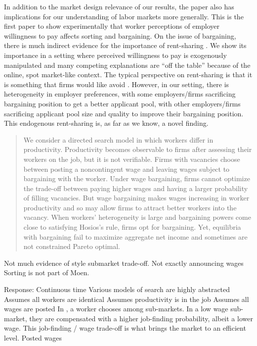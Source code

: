 In addition to the market design relevance of our results, the paper also has implications for our understanding of labor markets more generally.
This is the first paper to show experimentally that worker perceptions of employer willingness to pay affects sorting and bargaining.
On the issue of bargaining, there is much indirect evidence for the importance of rent-sharing \citep{blanchflower1996wages, card2015bargaining}.
We show its importance in a setting where perceived willingness to pay is exogenously manipulated and many competing explanations are ``off the table'' because of the online, spot market-like context.  
The typical perspective on rent-sharing is that it is something that firms would like avoid \citep{goldschmidt2017rise, weil2014fissured}.
However, in our setting, there is heterogeneity in employer preferences, with some employers/firms sacrificing bargaining position to get a better applicant pool, with other employers/firms sacrificing applicant pool size and quality to improve their bargaining position.
This endogenous rent-sharing is, as far as we know, a novel finding. 


\begin{quote}
\cite{michelacci2006incomplete}
We consider a directed search model in which workers differ in productivity. Productivity
becomes observable to firms after assessing their workers on the job, but it is not verifiable.
Firms with vacancies choose between posting a noncontingent wage and leaving wages
subject to bargaining with the worker. Under wage bargaining, firms cannot optimize the
trade-off between paying higher wages and having a larger probability of filling vacancies.
But wage bargaining makes wages increasing in worker productivity and so may allow firms to attract better workers into the vacancy. When workers’ heterogeneity is large and bargaining powers come close to satisfying Hosios’s rule, firms opt for bargaining. Yet, equilibria with bargaining fail to maximize aggregate net income and sometimes are not constrained Pareto optimal.

\end{quote}

Not much evidence of \cite{moen1997competitive} style submarket trade-off.
Not exactly announcing wages
Sorting is not part of Moen. 

Response:
\cite{moen1997competitive}
Continuous time 
Various models of search are highly abstracted 
Assumes all workers are identical
Assumes productivity is in the job
Assumes all wages are posted
In \cite{moen1997competitive}, a worker chooses among sub-markets.
In a low wage sub-market, they are compensated with a higher job-finding probability, albeit a lower wage. 
This job-finding / wage trade-off is what brings the market to an
efficient level.
Posted wages 

